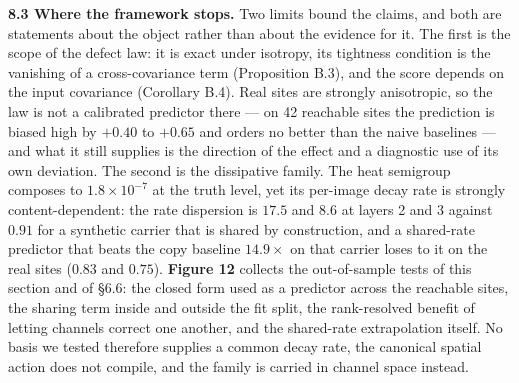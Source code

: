 \textbf{8.3 Where the framework stops.} Two limits bound the claims, and both are statements about the object rather than about the evidence for it. The first is the scope of the defect law: it is exact under isotropy, its tightness condition is the vanishing of a cross-covariance term (Proposition B.3), and the score depends on the input covariance (Corollary B.4). Real sites are strongly anisotropic, so the law is not a calibrated predictor there --- on 42 reachable sites the prediction is biased high by $+0.40$ to $+0.65$ and orders no better than the naive baselines --- and what it still supplies is the direction of the effect and a diagnostic use of its own deviation. The second is the dissipative family. The heat semigroup composes to $1.8\times10^{-7}$ at the truth level, yet its per-image decay rate is strongly content-dependent: the rate dispersion is $17.5$ and $8.6$ at layers 2 and 3 against $0.91$ for a synthetic carrier that is shared by construction, and a shared-rate predictor that beats the copy baseline $14.9\times$ on that carrier loses to it on the real sites ($0.83$ and $0.75$). \textbf{Figure 12} collects the out-of-sample tests of this section and of \S{}6.6: the closed form used as a predictor across the reachable sites, the sharing term inside and outside the fit split, the rank-resolved benefit of letting channels correct one another, and the shared-rate extrapolation itself. No basis we tested therefore supplies a common decay rate, the canonical spatial action does not compile, and the family is carried in channel space instead.

